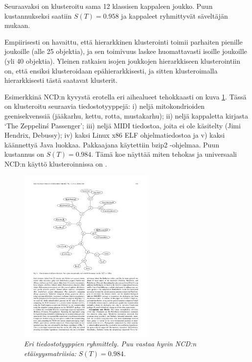 \documentclass[12pt,finnish,final]{tktltiki2}
\theoremstyle{definition}
\theoremstyle{remark}
\begin{document}
    Seuraavaksi on klusteroitu sama 12 klassisen kappaleen joukko. Puun kustannukseksi saatiin $S(T)=0.958$ ja kappaleet ryhmittyvät säveltäjän mukaan.

    Empiirisesti on havaittu, että hierarkkinen klusterointi toimii parhaiten pienille joukoille (alle 25 objektia), ja sen toimivuus laskee huomattavasti isoille joukoille (yli 40 objektia).
    Yleinen ratkaisu isojen joukkojen hierarkkiseen klusterointiin on, että ensiksi klusteroidaan epähierarkkisesti, ja sitten klusteroimalla hierarkkisesti tästä saatavat klusterit.

    Esimerkkinä NCD:n kyvystä erotella eri aihealueet tehokkaasti on kuva \ref{fig:classification}.
    Tässä on klusteroitu seuraavia tiedostotyyppejä: i) neljä mitokondrioiden geenisekvenssiä (jääkarhu, kettu, rotta, mustakarhu); ii) neljä kappaletta kirjasta `The Zeppelin\'s Passenger'; iii) neljä MIDI tiedostoa, joita ei ole käsitelty (Jimi Hendrix, Debussy); iv) kaksi Linux x86 ELF ohjelmatiedostoa ja v) kaksi käännettyä Java luokkaa.
    Pakkaajana käytettiin bzip2 -ohjelmaa.
    Puun kustannus on $S(T)=0.984$.
    Tämä koe näyttää miten tehokas ja universaali NCD:n käyttö klusteroinnissa on \cite{CV05}.

    \begin{figure}[tb]
      \immediate{}
      \includegraphics[width=0.6\textwidth]{img/classification}
      \caption{\emph{Eri tiedostotyyppien ryhmittely. Puu vastaa hyvin NCD:n etäisyysmatriisia: $S(T)=0.984$.}
      \cite{CV05} }
      \label{fig:classification}
    \end{figure}
\end{document}
